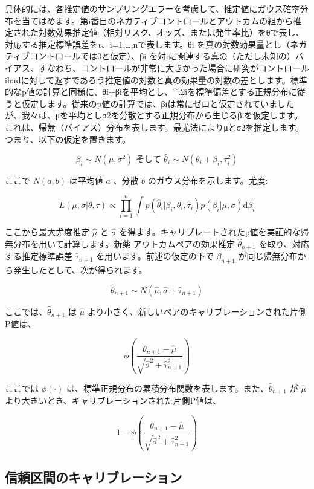 \documentclass[
  11pt]{book}
\theoremstyle{definition}
\theoremstyle{definition}
\theoremstyle{definition}
\theoremstyle{definition}
\theoremstyle{remark}
\begin{document}
具体的には、各推定値のサンプリングエラーを考慮して、推定値にガウス確率分布を当てはめます。第i番目のネガティブコントロールとアウトカムの組から推定された対数効果推定値（相対リスク、オッズ、または発生率比）をθで表し、対応する推定標準誤差をτ、i=1,\ldots,nで表します。θi を真の対数効果量とし（ネガティブコントロールでは0と仮定）、βi を対iに関連する真の（ただし未知の）バイアス、すなわち、コントロールが非常に大きかった場合に研究がコントロールihadに対して返すであろう推定値の対数と真の効果量の対数の差とします。標準的なp値の計算と同様に、θi+βiを平均とし、\^{}τ2iを標準偏差とする正規分布に従うと仮定します。従来のp値の計算では、βiは常にゼロと仮定されていましたが、我々は、μを平均としσ2を分散とする正規分布から生じるβiを仮定します。これは、帰無（バイアス）分布を表します。最尤法によりμとσ2を推定します。つまり、以下の仮定を置きます。

\[\beta_i \sim N(\mu,\sigma^2) \text{  そして  } \hat{\theta}_i \sim N(\theta_i + \beta_i, \tau_i^2)\]

ここで \(N(a,b)\) は平均値 \(a\) 、分散 \(b\) のガウス分布を示します。尤度:

\[L(\mu, \sigma | \theta, \tau) \propto \prod_{i=1}^{n}\int p(\hat{\theta}_i|\beta_i, \theta_i, \hat{\tau}_i)p(\beta_i|\mu, \sigma) \text{d}\beta_i\]

ここから最大尤度推定 \(\hat{\mu}\) と \(\hat{\sigma}\) を得ます。キャリブレートされたp値を実証的な帰無分布を用いて計算します。新薬-アウトカムペアの効果推定 \(\hat{\theta}_{n+1}\) を取り、対応する推定標準誤差 \(\hat{\tau}_{n+1}\) を用います。前述の仮定の下で \(\beta_{n+1}\) が同じ帰無分布から発生したとして、次が得られます。

\[\hat{\theta}_{n+1} \sim N(\hat{\mu}, \hat{\sigma} + \hat{\tau}_{n+1})\]

ここでは、\(\hat{\theta}_{n+1}\) は \(\hat{\mu}\) より小さく、新しいペアのキャリブレーションされた片側P値は、

\[\phi\left(\frac{\theta_{n+1} - \hat{\mu}}{\sqrt{\hat{\sigma}^2 + \hat{\tau}_{n+1}^2}}\right)\]

ここでは \(\phi(\cdot)\) は、標準正規分布の累積分布関数を表します。また、\(\hat{\theta}_{n+1}\) が \(\hat{\mu}\) より大きいとき、キャリブレーションされた片側P値は、

\[1-\phi\left(\frac{\theta_{n+1} - \hat{\mu}}{\sqrt{\hat{\sigma}^2 + \hat{\tau}_{n+1}^2}}\right)\]

\subsection{信頼区間のキャリブレーション}\label{ux4fe1ux983cux533aux9593ux306eux30adux30e3ux30eaux30d6ux30ecux30fcux30b7ux30e7ux30f3}
\end{document}
